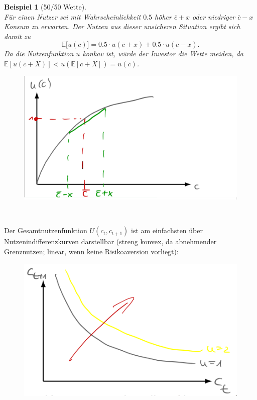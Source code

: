 \documentclass[12pt]{extreport} %
\theoremstyle{named}
\theoremstyle{nnamed}
\theoremstyle{itshape}
\theoremstyle{normal}
\newtheorem*{beispiel}{Beispiel}
\begin{document}
\begin{beispiel}[50/50 Wette] ~\\
	Für einen Nutzer sei mit Wahrscheinlichkeit $0.5$ höher $\overline{c} + x$ oder niedriger $\overline{c} - x$ Konsum zu erwarten. Der Nutzen aus dieser unsicheren Situation ergibt sich damit zu
		$$ \mathbb{E} \big[ u(c) \big] = 0.5 \cdot u ( \overline{c} + x ) + 0.5 \cdot u ( \overline{c} - x ). $$
	Da die Nutzenfunktion $u$ konkav ist, würde der Investor die Wette meiden, da $\mathbb{E}\left[ u\left(c + X\right) \right] < u\left(\mathbb{E}\left[c+ X\right]\right)  = u \left( \overline{c} \right)$.
\end{beispiel} 

\begin{figure}[h!] \centering
	\includegraphics[scale=0.2725]{img/p18}
\end{figure}

~\newpage

Der Gesamtnutzenfunktion $U(c_t, c_{t+1})$ ist am einfachsten über Nutzenindifferenzkurven darstellbar (streng konvex, da abnehmender Grenznutzen; linear, wenn keine Risikoaversion vorliegt): 
\begin{figure}[h!] \centering
	\includegraphics[scale=0.4]{img/p19}
\end{figure}
\end{document}
